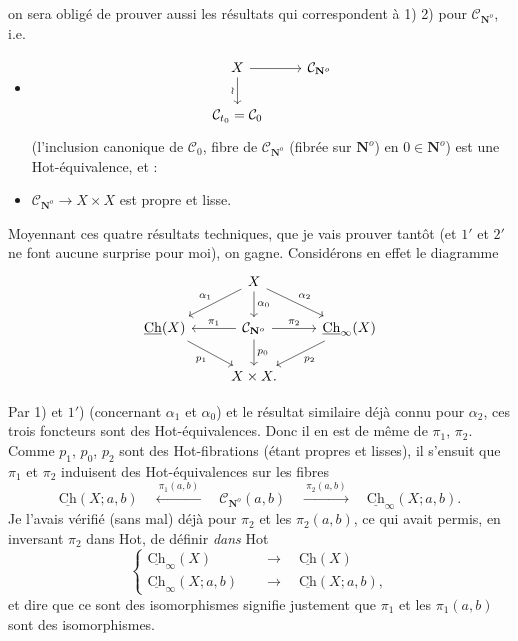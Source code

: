 \documentclass[11pt]{article}
\newcommand{\printedpage}[1]{\marginpar{\footnotesize p.~#1}}
\newcommand{\msp}[1]{\marginpar{\footnotesize [#1]}}
\newcommand{\Ch}{\underline{\mathrm{Ch}}}
\newcommand{\cC}{\mathcal{C}}
\newcommand{\NN}{\mathbf{N}^{o}}
\begin{document}
\printedpage{99}
on sera obligé de prouver aussi les résultats qui correspondent à 1) 2) pour $\cC_{\NN}$, i.e.

\begin{itemize}[label={}]
\item[1$'$)]
\[
\begin{tikzcd}
X \ar[r] \ar[d,"\wr"'] & \cC_{\NN} \\
\cC_{t_0} = \cC_0 &
\end{tikzcd}
\]
(l'inclusion canonique de $\cC_0$, fibre de $\cC_{\NN}$ (fibrée sur $\mathbf{N}^o$) en $0 \in \mathbf{N}^o$) est une Hot-équivalence, et :

\item[2$'$)] $\cC_{\NN} \longrightarrow X \times X$ est propre et lisse.
\end{itemize}

Moyennant ces quatre résultats techniques, que je vais prouver tantôt (et $1'$ et $2'$ ne font aucune surprise pour moi), on gagne. Considérons en effet le diagramme
\[
\begin{tikzcd}
& X \ar[dl,"\alpha_1"'] \ar[d,"\alpha_0"] \ar[dr,"\alpha_2"] & \\
\Ch(X) \ar[dr,"p_1"'] & \cC_{\NN} \ar[l,"\pi_1"'] \ar[r,"\pi_2"] \ar[d,"p_0"] & \Ch_{\infty}(X) \ar[dl,"p_2"] \\
& X \times X. &
\end{tikzcd}
\]

Par 1) et $1'$) (concernant $\alpha_1$ et $\alpha_0$) et le résultat
\msp{page 159}
similaire déjà connu pour $\alpha_2$, ces trois foncteurs sont des Hot-équivalences. Donc il en est de même de $\pi_1$, $\pi_2$. Comme $p_1$, $p_0$, $p_2$ sont des Hot-fibrations (étant propres et lisses), il s'ensuit que $\pi_1$ et $\pi_2$ induisent des Hot-équivalences sur les fibres
\[
\Ch(X;a,b) \quad \xleftarrow{\ \pi_1(a,b)\ } \quad \cC_{\NN}(a,b) \quad \xrightarrow{\ \pi_2(a,b)\ } \quad \Ch_{\infty}(X;a,b).
\]
Je l'avais vérifié (sans mal) déjà pour $\pi_2$ et les $\pi_2(a,b)$, ce qui avait permis, en inversant $\pi_2$ dans Hot, de définir \textit{dans} Hot
\[
\left\{
\begin{aligned}
\Ch_{\infty}(X) &\quad\longrightarrow\quad \Ch(X) \\
\Ch_{\infty}(X;a,b) &\quad\longrightarrow\quad \Ch(X;a,b),
\end{aligned}
\right.
\]
et dire que ce sont des isomorphismes signifie justement que $\pi_1$ et les $\pi_1(a,b)$ sont des isomorphismes.
\end{document}
